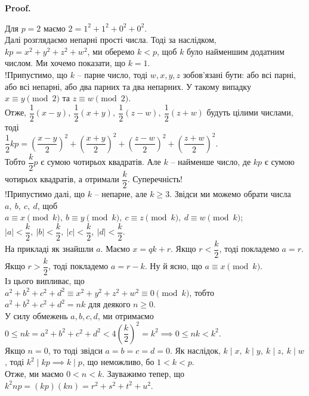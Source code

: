 \documentclass[a4paper, 10pt]{article}
\makeatletter
\theoremstyle{theoremdd}
\theoremstyle{theoremdd}
\theoremstyle{theoremdd}
\theoremstyle{theoremdd}
\theoremstyle{theoremdd}
\theoremstyle{theoremdd}
\theoremstyle{theoremdd}
\theoremstyle{theoremdd}
\renewenvironment{proof}[1][Proof.\\]{\par
\pushQED{\hfill \qed}%
\normalfont \topsep6\p@\@plus6\p@\relax
\trivlist
\item\relax
{\bfseries
#1\@addpunct{.}}\hspace\labelsep\ignorespaces
}{%
\popQED\endtrivlist\@endpefalse
}
\makeatother
\begin{document}
\begin{proof}
Для $p = 2$ маємо $2 = 1^2+1^2+0^2+0^2$.\\
Далі розглядаємо непарні прості числа. Тоді за наслідком, \\
$kp = x^2+y^2+z^2+w^2$, ми оберемо $k < p$, щоб $k$ було найменшим додатним числом. Ми хочемо показати, що $k = 1$.\\
!Припустимо, що $k$ -- парне число, тоді $w,x,y,z$ зобов'язані бути: або всі парні, або всі непарні, або два парних та два непарних. У такому випадку $x \equiv y \pmod 2$ та $z \equiv w \pmod 2$.\\
Отже, $\dfrac{1}{2}(x-y),\ \dfrac{1}{2}(x+y),\ \dfrac{1}{2}(z-w),\ \dfrac{1}{2}(z+w)$ будуть цілими числами, тоді\\
$\dfrac{1}{2}kp = \left( \dfrac{x-y}{2} \right)^2 + \left( \dfrac{x+y}{2} \right)^2 + \left( \dfrac{z-w}{2} \right)^2 + \left( \dfrac{z+w}{2} \right)^2$.\\
Тобто $\dfrac{k}{2}p$ є сумою чотирьох квадратів. Але $k$ -- найменше число, де $kp$ є сумою чотирьох квадратів, а отримали $\dfrac{k}{2}$. Суперечність!\\
!Припустимо далі, що $k$ -- непарне, але $k \geq 3$. Звідси ми можемо обрати числа $a,\ b,\ c,\ d$, щоб\\
$a \equiv x \pmod k,\ b \equiv y \pmod k,\ c \equiv z \pmod k,\ d \equiv w \pmod k$;\\
$|a| < \dfrac{k}{2},\ |b| < \dfrac{k}{2},\ |c| < \dfrac{k}{2},\ |d| < \dfrac{k}{2}$.\\
На прикладі як знайшли $a$. Маємо $x = qk + r$. Якщо $r < \dfrac{k}{2}$, тоді покладемо $a = r$. Якщо $r > \dfrac{k}{2}$, тоді покладемо $a = r-k$. Ну й ясно, що $a \equiv x \pmod k$.\\
Із цього випливає, що\\
$a^2+b^2+c^2+d^2 \equiv x^2+y^2+z^2+w^2 \equiv 0 \pmod k$, тобто\\
$a^2+b^2+c^2+d^2 = nk$ для деякого $n \geq 0$.\\
У силу обмежень $a,b,c,d$, ми отримаємо\\
$0 \leq nk = a^2+b^2+c^2+d^2 < 4 \left( \dfrac{k}{2} \right)^2 = k^2 \implies 0 \leq nk < k^2$.\\
Якщо $n = 0$, то тоді звідси $a=b=c=d=0$. Як наслідок, $k \mid x,\ k \mid y,\ k \mid z,\ k \mid w$, тоді $k^2 \mid kp \implies k \mid p$, що неможливо, бо $1 < k < p$.\\
Отже, ми маємо $0 < n < k$. Зауважимо тепер, що\\
$k^2np = (kp)(kn) = r^2+s^2+t^2+u^2$.\\

\end{proof}
\end{document}
